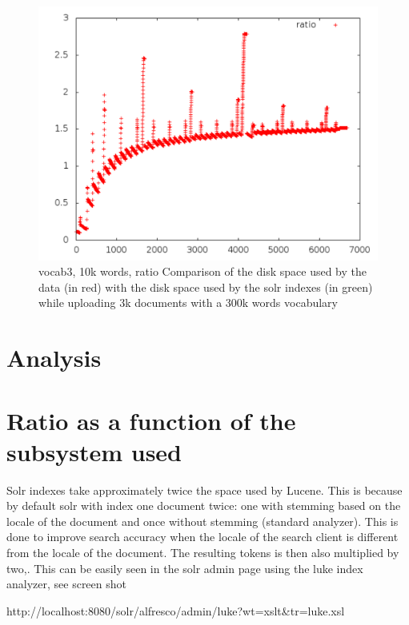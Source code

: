 \documentclass[12pt,a4]{article}
\begin{document}
\begin{figure}[h]
\begin{center}
\includegraphics[width=130mm]{out_ratio_vocab3_10k}
\end{center}
\caption{vocab3, 10k words, ratio Comparison of the disk space used by the data (in red) with the disk space used by the solr indexes (in green) while uploading 3k documents with a 300k words vocabulary}
\end{figure}



\section{Analysis}
\section{Ratio as a function of the subsystem used}
Solr indexes take approximately twice the space used by Lucene.
This is because by default solr with index one document twice: one with stemming based on the locale of the document and once without stemming (standard analyzer).
This is done to improve search accuracy when the locale of the search client is different from the locale of the document.
The resulting tokens is then also multiplied by two,.
This can be easily seen in the solr admin page using the luke index analyzer, see screen shot
 
http://localhost:8080/solr/alfresco/admin/luke?wt=xslt\&tr=luke.xsl
\end{document}

